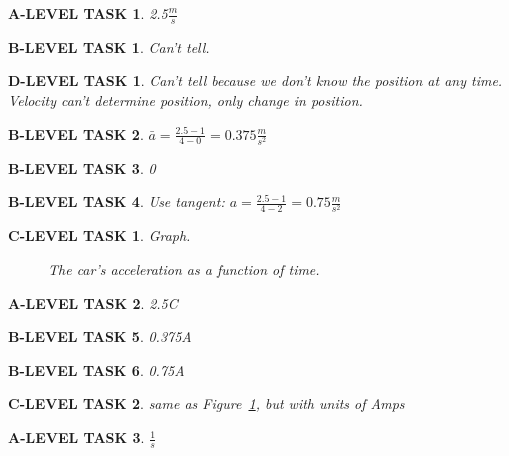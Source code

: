 \documentclass{book}
\numberwithin{equation}{section}
\newtheorem{alevel}{A-LEVEL TASK}
\newtheorem{blevel}{B-LEVEL TASK}
\newtheorem{clevel}{C-LEVEL TASK}
\newtheorem{dlevel}{D-LEVEL TASK}
\theoremstyle{definition}
\begin{document}
\begin{alevel}2.5$\frac{m}{s}$\end{alevel}
\begin{blevel}Can't tell.\end{blevel}
\begin{dlevel}Can't tell because we don't know the position at any time. Velocity can't determine position, only change in position.\end{dlevel}
\begin{blevel}$\bar{a}=\frac{2.5-1}{4-0}=0.375\frac{m}{s^2}$\end{blevel}
\begin{blevel}0\end{blevel}
\begin{blevel}Use tangent: $a=\frac{2.5-1}{4-2}=0.75\frac{m}{s^2}$\end{blevel}

\begin{clevel} Graph.\par
\begin{figure}[H]
\begin{center}
\caption{The car's acceleration as a function of time.}
\label{F:2CAR}
\end{center}
\end{figure}
\end{clevel}

\begin{alevel}2.5C\end{alevel}
\begin{blevel}0.375A\end{blevel}
\begin{blevel}0.75A\end{blevel}
\begin{clevel}same as Figure~\ref{F:2CAR}, but with units of Amps\end{clevel}
\begin{alevel}$\frac{1}{s}$\end{alevel}
\end{document}
